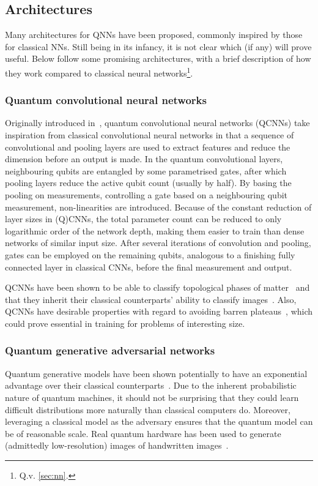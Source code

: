 \subsection{Architectures}
\label{sec:qnn_arch}
Many architectures for QNNs have been proposed, commonly inspired by those for classical NNs.
Still being in its infancy, it is not clear which (if any) will prove useful.
Below follow some promising architectures, with a brief description of how they work compared to classical neural networks\footnote{Q.v. \cref{sec:nn}.}.

\subsubsection{Quantum convolutional neural networks}
\label{sec:qcnn}
Originally introduced in~\autocite{cong2019}, quantum convolutional neural networks (QCNNs) take inspiration from classical convolutional neural networks in that a sequence of convolutional and pooling layers are used to extract features and reduce the dimension before an output is made.
In the quantum convolutional layers, neighbouring qubits are entangled by some parametrised gates, after which pooling layers reduce the active qubit count (usually by half).
By basing the pooling on measurements, controlling a gate based on a neighbouring qubit measurement, non-linearities are introduced.
Because of the constant reduction of layer sizes in (Q)CNNs, the total parameter count can be reduced to only logarithmic order of the network depth, making them easier to train than dense networks of similar input size.
After several iterations of convolution and pooling, gates can be employed on the remaining qubits, analogous to a finishing fully connected layer in classical CNNs, before the final
measurement and output.

QCNNs have been shown to be able to classify topological phases of matter~\autocite{cong2019} and that they inherit their classical counterparts' ability to classify images~\autocite{oh2020}.
Also, QCNNs have desirable properties with regard to avoiding barren plateaus~\autocite{pesah2021}, which could prove essential in training for problems of interesting size.

\subsubsection{Quantum generative adversarial networks}
Quantum generative models have been shown potentially to have an exponential advantage over their classical counterparts~\autocite{gao2018}.
Due to the inherent probabilistic nature of quantum machines, it should not be surprising that they could learn difficult distributions more naturally than classical computers do.
Moreover, leveraging a classical model as the adversary ensures that the quantum model can be of reasonable scale.
Real quantum hardware has been used to generate (admittedly low-resolution) images of handwritten images~\autocite{huang2021}.

